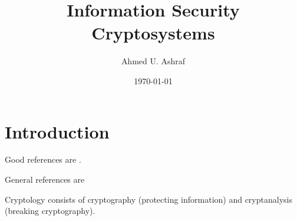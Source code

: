 \documentclass[a4paper, 12pt]{book} %
\title{Information Security \\ Cryptosystems}
\author{Ahmed U. Ashraf}
\date{\today }
\begin{document}
% 


\maketitle


\tableofcontents\label{toc}





















\chapter{Introduction}


Good references are \cite{katz2007introduction, rosulek2021joy, boneh2020graduate}.

General references are \cite{pardo2013introduction, sharp2023introduction, paar2024understanding, delfs2002introduction, wu2016introduction, schwenk2022guide, kizza2005computer, manz2022encrypt, stinson2018cryptography, nielson2023discovering, von2015cryptoschool, klima2012cryptology, stinson1995introduction, stallings2006cryptography, dong2012cryptographic, de2022cryptography, easttom2019computer, van2021computer, konheim2007computer, sheikh2020comptia, banoth2023classical, vaudenay2006classical}

Cryptology consists of cryptography (protecting information) and cryptanalysis (breaking cryptography).
\end{document}
